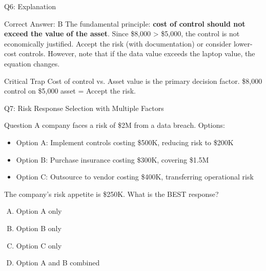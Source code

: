 \documentclass{beamer}
\begin{document}
	\begin{frame}{Q6: Explanation}
		\begin{block}{Correct Answer: B}
			The fundamental principle: \textbf{cost of control should not exceed the value of the asset}. Since \$8,000 > \$5,000, the control is not economically justified. Accept the risk (with documentation) or consider lower-cost controls. However, note that if the data value exceeds the laptop value, the equation changes.
		\end{block}
		\begin{alertblock}{Critical Trap}
			Cost of control vs. Asset value is the primary decision factor.
			\$8,000 control on \$5,000 asset = Accept the risk.
		\end{alertblock}
	\end{frame}
	
	\begin{frame}{Q7: Risk Response Selection with Multiple Factors}
		\begin{block}{Question}
			A company faces a risk of \$2M from a data breach. Options:
			\begin{itemize}
				\item Option A: Implement controls costing \$500K, reducing risk to \$200K
				\item Option B: Purchase insurance costing \$300K, covering \$1.5M
				\item Option C: Outsource to vendor costing \$400K, transferring operational risk
			\end{itemize}
			The company's risk appetite is \$250K. What is the BEST response?
		\end{block}
		\begin{enumerate}[(A)]
			\item Option A only
			\item Option B only
			\item Option C only
			\item Option A and B combined
		\end{enumerate}
	\end{frame}
	
\end{document}

